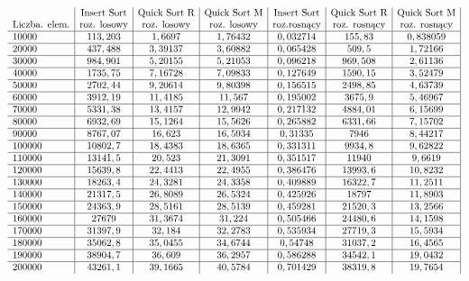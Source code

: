 \documentclass[polish,polish,a4paper]{article}
\begin{document}
\begin{spacing}{1.5}
\begin{figure}[H]
	\begin{equation*}
	\begin{array}{l|c|c|c|c|c|c|}
	
	&$Insert Sort$&$Quick Sort R$&$Quick Sort M$&$Insert Sort$&$Quick Sort R$&$Quick Sort M$\\
	$Liczba. elem.$&$roz. losowy$&$roz. losowy$&$roz. losowy$&$roz.rosnący$&$roz. rosnący$&$roz. rosnący$\\\hline
	10000&	113,203&	1,6697&	1,76432&	0,032714&	155,83&	0,838059\\\hline
	20000&	437,488&	3,39137&	3,60882&	0,065428&	509,5&	1,72166\\\hline
	30000&	984,901&	5,20155&	5,21053&	0,096218&	969,508&	2,61136\\\hline
	40000&	1735,75&	7,16728&	7,09833&	0,127649&	1590,15&	3,52479\\\hline
	50000&	2702,44&	9,20614&	9,80398&	0,156515&	2498,85&	4,63739\\\hline
	60000&	3912,19&	11,4185&	11,567&	0,195002&	3675,9&	5,46967\\\hline
	70000&	5331,38&	13,4157&	12,9942&	0,217132&	4884,01&	6,15699\\\hline
	80000&	6932,69&	15,1264&	15,5626&	0,265882&	6331,66&	7,15702\\\hline
	90000&	8767,07&	16,623&	16,5934&	0,31335&	7946&	8,44217\\\hline
	100000&	10802,7&	18,4383&	18,6365&	0,331311&	9934,8&	9,62822\\\hline
	110000&	13141,5&	20,523&	21,3091&	0,351517&	11940&	9,6619\\\hline
	120000&	15639,8&	22,4413&	22,4955&	0,386476&	13993,6&	10,8232\\\hline
	130000&	18263,4&	24,3281&	24,3358&	0,409889&	16322,7&	11,2511\\\hline
	140000&	21317,5&	26,8089&	26,5324&	0,425926&	18797&	11,8903\\\hline
	150000&	24363,9&	28,5161&	28,5139&	0,459281&	21520,3&	13,2566\\\hline
	160000&	27679&	31,3674&	31,224&	0,505466&	24480,6&	14,1598\\\hline
	170000&	31397,9&	32,184&	32,2783&	0,535934&	27719,3&	15,5934\\\hline
	180000&	35062,8&	35,0455&	34,6744&	0,54748&	31037,2&	16,4565\\\hline
	190000&	38904,7&	36,609&	36,2957&	0,586288&	34542,1&	19,0432\\\hline
	200000&	43261,1&	39,1665&	40,5784&	0,701429&	38319,8&	19,7654\\
	

\end{array}
\end{equation*}
\end{figure}
\end{spacing}
\end{document}
